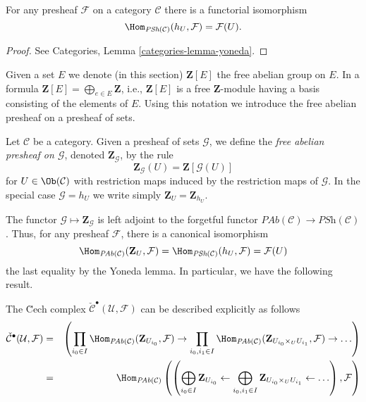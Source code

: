 \begin{lemma}
\label{lemma-yoneda-presheaf}
For any presheaf $\mathcal{F}$ on a category $\mathcal{C}$ there is a
functorial isomorphism
$$
\Hom_{\textit{PSh}(\mathcal{C})}(h_U, \mathcal{F}) =
\mathcal{F}(U).
$$
\end{lemma}

\begin{proof}
See Categories, Lemma \ref{categories-lemma-yoneda}.
\end{proof}

\noindent
Given a set $E$ we denote (in this section)
$\mathbf{Z}[E]$ the free abelian group on $E$. In a formula
$\mathbf{Z}[E] = \bigoplus_{e \in E} \mathbf{Z}$, i.e., $\mathbf{Z}[E]$ is
a free $\mathbf{Z}$-module having a basis consisting of the elements of $E$.
Using this notation we introduce the free abelian presheaf on a
presheaf of sets.

\begin{definition}
\label{definition-free-abelian-presheaf}
Let $\mathcal{C}$ be a category.
Given a presheaf of sets $\mathcal{G}$, we define the
{\it free abelian presheaf on $\mathcal{G}$},
denoted $\mathbf{Z}_\mathcal{G}$, by the rule
$$
\mathbf{Z}_\mathcal{G}(U)
=
\mathbf{Z}[\mathcal{G}(U)]
$$
for $U \in \Ob(\mathcal{C})$
with restriction maps induced by the restriction maps of $\mathcal{G}$.
In the special case $\mathcal{G} = h_U$ we write simply
$\mathbf{Z}_U = \mathbf{Z}_{h_U}$.
\end{definition}

\noindent
The functor $\mathcal{G} \mapsto \mathbf{Z}_\mathcal{G}$ is left adjoint to the
forgetful functor $\textit{PAb}(\mathcal{C}) \to \textit{PSh}(\mathcal{C})$.
Thus, for any presheaf $\mathcal{F}$, there is a canonical isomorphism
$$
\Hom_{\textit{PAb}(\mathcal{C})}(\mathbf{Z}_U, \mathcal{F})
=
\Hom_{\textit{PSh}(\mathcal{C})}(h_U, \mathcal{F})
=
\mathcal{F}(U)
$$
the last equality by the Yoneda lemma. In particular, we have the following
result.

\begin{lemma}
\label{lemma-cech-complex-describe}
The \u Cech complex $\check{\mathcal{C}}^\bullet(\mathcal{U}, \mathcal{F})$
can be described explicitly as follows
\begin{eqnarray*}
\check{\mathcal{C}}^\bullet(\mathcal{U}, \mathcal{F})
& = &
\left(
\prod_{i_0 \in I}
\Hom_{\textit{PAb}(\mathcal{C})}(\mathbf{Z}_{U_{i_0}}, \mathcal{F}) \to
\prod_{i_0, i_1 \in I}
\Hom_{\textit{PAb}(\mathcal{C})}(
\mathbf{Z}_{U_{i_0} \times_U U_{i_1}}, \mathcal{F}) \to \ldots
\right) \\
& = &
\Hom_{\textit{PAb}(\mathcal{C})}\left(
\left(
\displaystyle
\bigoplus_{i_0 \in I} \mathbf{Z}_{U_{i_0}} \leftarrow
\bigoplus_{i_0, i_1 \in I} \mathbf{Z}_{U_{i_0} \times_U U_{i_1}} \leftarrow
\ldots
\right), \mathcal{F}\right)
\end{eqnarray*}
\end{lemma}

